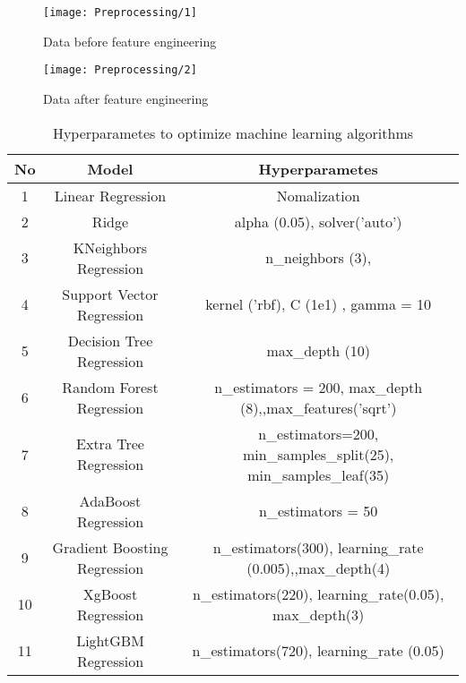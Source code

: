 \documentclass[english]{article}
\makeatletter
\def\maxwidth{\ifdim\Gin@nat@width>\linewidth\linewidth
    \else\Gin@nat@width\fi}
\let\Oldincludegraphics\includegraphics
\renewcommand{\includegraphics}[1]{\Oldincludegraphics[width=.8\maxwidth]{#1}}
\makeatother
\begin{document}
\begin{appendices}
\begin{figure}[H]
  \texttt{[image: Preprocessing/1]}
  \caption{Data before feature engineering}\label{fig:awesome_image1}
\endminipage\hfill
{}
  \texttt{[image: Preprocessing/2]}
  \caption{Data after feature engineering}\label{fig:awesome_image2}
\endminipage\hfill
\end{figure}


\begin{table}[H]
\centering
\caption{Hyperparametes to optimize machine learning algorithms}

\begin{tabular}{|c|c|c|}
\hline
\textbf{No} & \textbf{Model}               & \textbf{Hyperparametes}                                            \\ \hline
1           & Linear Regression            & Nomalization                                                       \\ \hline
2           & Ridge                        & alpha (0.05), solver('auto')                                       \\ \hline
3           & KNeighbors Regression        & n\_neighbors (3),                                                  \\ \hline
4           & Support Vector Regression    & kernel ('rbf), C (1e1) , gamma = 10                                \\ \hline
5           & Decision Tree Regression     & max\_depth (10)                                                    \\ \hline
6           & Random Forest Regression     & n\_estimators = 200, max\_depth (8),,max\_features('sqrt')         \\ \hline
7           & Extra Tree Regression        & n\_estimators=200, min\_samples\_split(25), min\_samples\_leaf(35) \\ \hline
8           & AdaBoost Regression          & n\_estimators = 50                                                 \\ \hline
9           & Gradient Boosting Regression & n\_estimators(300), learning\_rate (0.005),,max\_depth(4)          \\ \hline
10          & XgBoost Regression           & n\_estimators(220), learning\_rate(0.05), max\_depth(3)            \\ \hline
11          & LightGBM Regression          & n\_estimators(720), learning\_rate (0.05)                          \\ \hline
\end{tabular}
\end{table}




\end{appendices}
\end{document}
